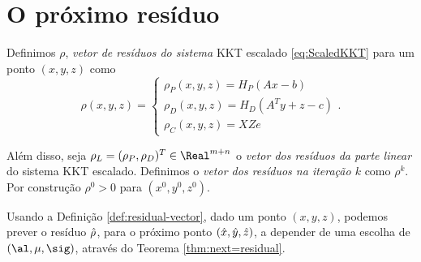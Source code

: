 \section{O próximo resíduo}

\begin{defin} 
\label{def:residual-vector}
Definimos  $\rho$, \emph{vetor de resíduos do sistema} \ac{KKT}  escalado
\eqref{eq:ScaledKKT} para um ponto $(x,y,z)$ como
\begin{equation}
\label{eq:residuals}
\rho(x,y,z) = 
\begin{cases}
\rho_P (x,y,z)= H_P(A{x} -b)  \\
\rho_D(x,y,z)= H_D(A^T{y} +{z} -c) \\
\rho_C(x,y,z)= {X}{Z}e
\end{cases}.
\end{equation}

Além disso, seja  $\rho_L = (\rho_P,\rho_D)^T\in\Real^{m+n}$ o \emph{vetor dos
resíduos da parte linear} do  sistema \ac{KKT} escalado. Definimos o
\emph{vetor dos resíduos na iteração $k$} como $\rho^k$.
Por construção $\rho^0>0$ para $(x^0,y^0,z^0)$.
\end{defin} 



Usando a Definição \ref{def:residual-vector}, dado um ponto  $(x,y,z)$, podemos 
prever o resíduo $\hat{\rho}$, para o próximo ponto $(\hat{x},\hat{y},\hat{z})$, a  depender de uma escolha de 
$(\al,\mu,\sig)$, através do Teorema \ref{thm:next=residual}. 

